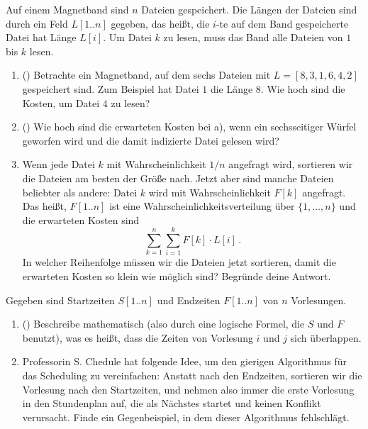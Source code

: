 \documentclass{uebung_cs}
\begin{document}
\begin{aufgabe}
    Auf einem Magnetband sind $n$ Dateien gespeichert.
    Die Längen der Dateien sind durch ein Feld $L[1..n]$ gegeben, das heißt, die $i$-te auf dem Band gespeicherte Datei hat Länge $L[i]$.
    Um Datei $k$ zu lesen, muss das Band alle Dateien von $1$ bis $k$ lesen.
    \begin{enumerate}
        \item(\warmup) Betrachte ein Magnetband, auf dem sechs Dateien mit $L=[8,3,1,6,4,2]$ gespeichert sind. Zum Beispiel hat Datei $1$ die Länge $8$.
        Wie hoch sind die Kosten, um Datei $4$ zu lesen?
        \item(\warmup) Wie hoch sind die erwarteten Kosten bei a), wenn ein sechsseitiger Würfel geworfen wird und die damit indizierte Datei gelesen wird?
        \item Wenn jede Datei $k$ mit Wahrscheinlichkeit $1/n$ angefragt wird, sortieren wir die Dateien am besten der Größe nach. Jetzt aber sind manche Dateien beliebter als andere: Datei $k$ wird mit Wahrscheinlichkeit $F[k]$ angefragt. Das heißt, $F[1..n]$ ist eine Wahrscheinlichkeitsverteilung über $\{1,\dots,n\}$ und die erwarteten Kosten sind
          \[\sum_{k=1}^n \sum_{i=1}^k F[k]\cdot L[i]\,.\]
        In welcher Reihenfolge müssen wir die Dateien jetzt sortieren, damit die erwarteten Kosten so klein wie möglich sind? Begründe deine Antwort.
    \end{enumerate}
\end{aufgabe}

\begin{aufgabe}[Scheduling]
    Gegeben sind Startzeiten $S[1..n]$ und Endzeiten $F[1..n]$ von $n$ Vorlesungen.
    \begin{enumerate}
        \item(\warmup) Beschreibe mathematisch (also durch eine logische Formel, die $S$ und $F$ benutzt), was es heißt, dass die Zeiten von Vorlesung $i$ und $j$ sich überlappen.
        \item Professorin S. Chedule hat folgende Idee, um den gierigen Algorithmus für das Scheduling zu vereinfachen: Anstatt nach den Endzeiten, sortieren wir die Vorlesung nach den Startzeiten, und nehmen also immer die erste Vorlesung in den Stundenplan auf, die als Nächstes startet und keinen Konflikt verursacht. Finde ein Gegenbeispiel, in dem dieser Algorithmus fehlschlägt.
    \end{enumerate}
\end{aufgabe}
\end{document}

